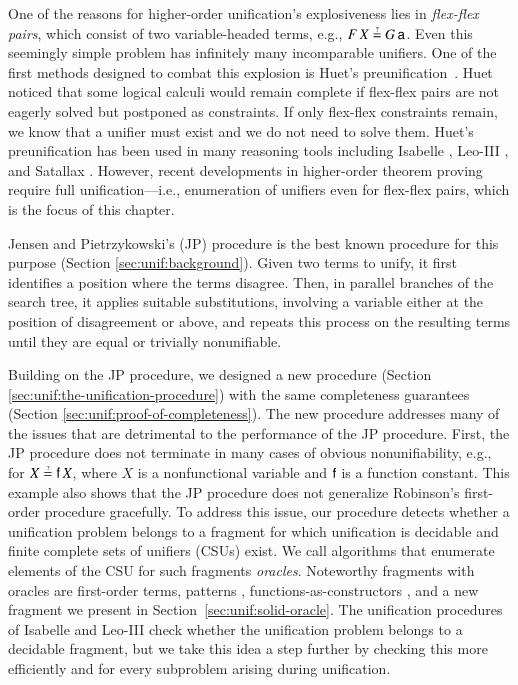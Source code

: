 One of the reasons for higher-order unification's explosiveness lies in
\emph{flex-flex pairs}, which consist of two variable-headed terms,
e.g., $F \, X \unif G \, \cst{a}$. Even this seemingly simple
problem has infinitely many incomparable unifiers.
%
One of the first methods designed to combat this explosion is Huet's
preunification~\cite{gh-75-unification}. Huet noticed that some logical calculi
would remain complete if flex-flex pairs are not eagerly solved but postponed as
constraints. If only flex-flex constraints remain, we know that a unifier must
exist and we do not need to solve them.
%
Huet's preunification has been used in many reasoning tools including Isabelle
\cite{tn-02-isabelle}, Leo-III \cite{sb-21-leo3}, and Satallax
\cite{cb-12-satallax}. However, recent developments in higher-order theorem
proving~\cite{bbtvw-21-sup-lam,br-19-restricted-unif} require full unification---i.e., enumeration of unifiers even for
flex-flex pairs, which is the focus of this chapter.

Jensen and Pietrzykowski's (JP) procedure \cite{jp-76-unif} is the best known
procedure for this purpose (Section \ref{sec:unif:background}). Given two terms to
unify, it first identifies a position where the terms disagree.
Then, in parallel branches of the search tree, it applies suitable substitutions, involving a
variable either at the position of disagreement or above, and repeats this process on
the resulting terms until they are equal or trivially nonunifiable.

Building on the JP procedure, we designed a new procedure (Section
\ref{sec:unif:the-unification-procedure}) with the same completeness guarantees (Section \ref{sec:unif:proof-of-completeness}).
The new procedure addresses many of the issues that are
detrimental to the performance of the JP procedure.
%
First, the JP procedure does not terminate in many cases of obvious
nonunifiability, e.g., for $X \unif \cst{f} \, X$, where $X$ is a nonfunctional
variable and $\mathsf{f}$ is a function constant. This example also shows that
the JP procedure does not generalize Robinson's first-order procedure gracefully. To address
this issue, our procedure detects whether a unification problem belongs to a
fragment for which unification is decidable and finite complete sets of unifiers (CSUs)
exist.
We call algorithms that enumerate elements of the CSU for such fragments
\emph{oracles}. Noteworthy fragments with oracles are first-order terms,
patterns \cite{tn-93-patterns}, functions-as-constructors
\cite{tl-16-facunif}, and a new fragment 
we present in Section~\ref{sec:unif:solid-oracle}.
%
The unification procedures of Isabelle and Leo-III check whether the unification
problem belongs to a decidable fragment, but we take this idea a step further by
checking this more efficiently and for every subproblem arising during
unification.

